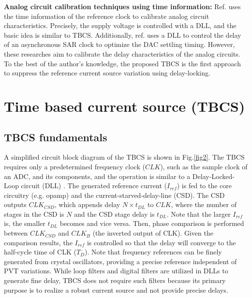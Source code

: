 \documentclass[paper]{ieice}
\begin{document}
\textbf{Analog circuit calibration techniques using time information:} Ref.\cite{zhu} uses the time information of the reference clock to calibrate analog circuit characteristics. Precisely, the supply voltage is controlled with a DLL, and the basic idea is similar to TBCS. Additionally, ref.\cite{kapusta201314b,tompson} uses a DLL to control the delay of an asynchronous SAR clock to optimize the DAC settling timing.
However, these researches aim to calibrate the delay characteristics of the analog circuits. To the best of the author's knowledge, the proposed TBCS is the first approach to suppress the reference current source variation using delay-locking.

\section{Time based current source (TBCS)}
\subsection{TBCS fundamentals}
\qquad A simplified circuit block diagram of the TBCS is shown in Fig.\ref{fig2}. The TBCS requires only a  predetermined frequency clock ($CLK$), such as the sample clock of an ADC, and its components, and the operation is similar to a Delay-Locked-Loop circuit (DLL) \cite{ sidiropoulos1997semidigital, lee19942, razavi2018delay}. The generated reference current ($I_{ref}$) is fed to the core circuitry (e.g. opamp) and the current-starved-delay-line (CSD). The CSD outputs $CLK_{CSD}$, which appends delay $N \times t_{DL}$ to $CLK$, where the number of stages in the CSD is $N$ and the CSD stage delay is $t_{DL}$. Note that the larger $I_{ref}$ is, the smaller $t_{DL}$ becomes and vice versa. 
Then, phase comparison is performed between $CLK_{CSD}$ and $CLK_B$ (the inverted output of CLK). Given the comparison results, the $I_{ref}$ is controlled so that the delay will converge to the half-cycle time of CLK ($T_D$). Note that frequency references can be finely generated from crystal oscillators, providing a precise reference independent of PVT variations. While loop filters \cite{sidiropoulos1997semidigital} and digital filters \cite{kim20172} are utilized in DLLs to generate fine delay, TBCS does not require such filters because its primary purpose is to realize a robust current source and not provide precise delays.
\end{document}

